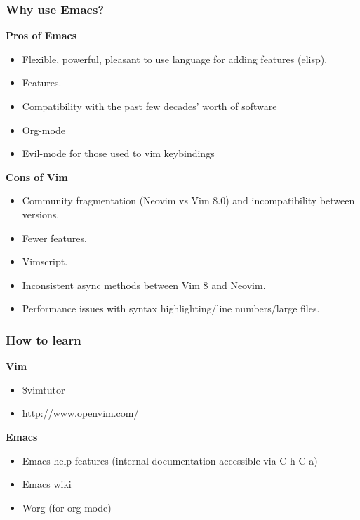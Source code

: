 \documentclass[8pt]{beamer}
\begin{document}
\begin{frame}
  \frametitle{Why use Emacs?}
  \begin{multicols}{2}
    \textbf{Pros of Emacs}
    \begin{itemize}
    \item Flexible, powerful, pleasant to use language for adding
      features (elisp).
    \item Features.
    \item Compatibility with the past few decades' worth of software
    \item Org-mode
    \item Evil-mode for those used to vim keybindings
    \end{itemize}
    \columnbreak
    \textbf{Cons of Vim}
    \begin{itemize}
    \item Community fragmentation (Neovim vs Vim 8.0) and
      incompatibility between versions.
    \item Fewer features.
    \item Vimscript.
    \item Inconsistent async methods between Vim 8 and Neovim.
    \item Performance issues with syntax highlighting/line
      numbers/large files.
    \end{itemize}
  \end{multicols}
\end{frame}

\begin{frame}
  \frametitle{How to learn}
  \textbf{Vim}
  \begin{itemize}
  \item \$vimtutor
  \item http://www.openvim.com/
  \end{itemize}
  \textbf{Emacs}
  \begin{itemize}
  \item Emacs help features (internal documentation accessible via C-h C-a)
  \item Emacs wiki
  \item Worg (for org-mode)
  \end{itemize}
\end{frame}
\end{document}
